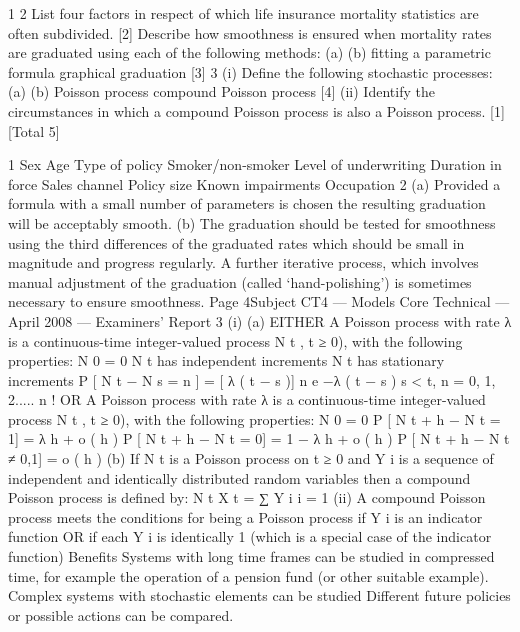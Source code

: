 \documentclass[a4paper,12pt]{article}
\begin{document}
\begin{enumerate}
1
2
List four factors in respect of which life insurance mortality statistics are often
subdivided.
[2]
Describe how smoothness is ensured when mortality rates are graduated using each of
the following methods:
(a)
(b)
fitting a parametric formula
graphical graduation
[3]
3
(i)
Define the following stochastic processes:
(a)
(b)
Poisson process
compound Poisson process
[4]
(ii)
Identify the circumstances in which a compound Poisson process is also a
Poisson process.
[1]
[Total 5]


1 Sex
Age
Type of policy
Smoker/non-smoker
Level of underwriting
Duration in force
Sales channel
Policy size
Known impairments
Occupation
2 (a) Provided a formula with a small number of
parameters is chosen
the resulting graduation will be acceptably smooth.
(b) The graduation should be tested for smoothness
using the third differences of the graduated rates
which should be small in magnitude and progress
regularly.
A further iterative process, which involves manual adjustment of the
graduation (called ‘hand-polishing’) is sometimes necessary to ensure
smoothness.
Page 4Subject CT4 — Models Core Technical — April 2008 — Examiners’ Report
3
(i)
(a)
EITHER
A Poisson process with rate λ is a continuous-time
integer-valued process N t ,
t ≥ 0), with the following properties:
N 0 = 0
N t has independent increments
N t has stationary increments
P [ N t − N s = n ] =
[ λ ( t − s )] n e −λ ( t − s )
s < t, n = 0, 1, 2.....
n !
OR
A Poisson process with rate λ is a continuous-time
integer-valued process N t ,
t ≥ 0), with the following properties:
N 0 = 0
P [ N t + h − N t = 1] = λ h + o ( h )
P [ N t + h − N t = 0] = 1 − λ h + o ( h )
P [ N t + h − N t ≠ 0,1] = o ( h )
(b)
If N t is a Poisson process on t ≥ 0 and Y i is a sequence of
independent and identically distributed random variables then a
compound Poisson process is defined by:
N t
X t = ∑ Y i
i = 1
(ii)
A compound Poisson process meets the conditions for being
a Poisson process if Y i is an indicator function OR if each Y i is identically
1 (which is a special case of the indicator function)
Benefits
Systems with long time frames can be studied in compressed time,
for example the operation of a pension fund (or other suitable example).
Complex systems with stochastic elements can be studied
Different future policies or possible actions can be compared.

\end{enumerate}
\end{document}
